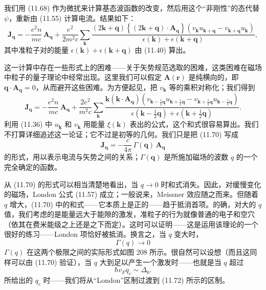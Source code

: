 我们用 (11.68) 作为微扰来计算基态波函数的改变，然后用这个“非刚性”的态代替 $\psi$，重新由 (11.55) 计算电流。结果如下：
\begin{equation*}
\mathbf{J}_{\mathbf{q}} = -\frac{e^{2}n}{mc}\,\mathbf{A}_{\mathbf{q}} + \frac{e^{2}}{2m^{2}c}\sum_{\mathbf{k}}\frac{(2\mathbf{k}+\mathbf{q})\left\{(2\mathbf{k}+\mathbf{q})\cdot\mathbf{A}_{\mathbf{q}}\right\}(v_{\mathbf{k}}u_{\mathbf{k}+\mathbf{q}} - v_{\mathbf{k}+\mathbf{q}}u_{\mathbf{k}})}{\epsilon(\mathbf{k})+\epsilon(\mathbf{k}+\mathbf{q})}, \tag{11.69}
\end{equation*}
其中准粒子对的能量 $\epsilon(\mathbf{k})+\epsilon(\mathbf{k}+\mathbf{q})$ 由 (11.40) 算出。

这一计算中存在一些形式上的困难——关于矢势规范选取的困难，这类困难在磁场中粒子的量子理论中经常出现。这里我们可以假定 $\mathbf{A}(\mathbf{r})$ 是纯横向的，即 $\mathbf{q}\cdot\mathbf{A}_{\mathbf{q}}=0$，从而避开这些困难。为方便起见，把 $v_{\mathbf{k}}$ 等的乘积对称化；我们得到
\begin{equation*}
\mathbf{J}_{\mathbf{q}} = -\frac{e^{2}n}{mc}\,\mathbf{A}_{\mathbf{q}} + \frac{2e^{2}}{m^{2}c}\sum_{\mathbf{k}}\frac{\mathbf{k}(\mathbf{k}\cdot\mathbf{A}_{\mathbf{q}})\left(v_{\mathbf{k}-\frac{1}{2}\mathbf{q}}u_{\mathbf{k}+\frac{1}{2}\mathbf{q}} - v_{\mathbf{k}+\frac{1}{2}\mathbf{q}}u_{\mathbf{k}-\frac{1}{2}\mathbf{q}}\right)}{\epsilon(\mathbf{k}-\frac{1}{2}\mathbf{q})+\epsilon(\mathbf{k}+\frac{1}{2}\mathbf{q})}. \tag{11.70}
\end{equation*}
利用 (11.36) 中 $u_{\mathbf{k}}$ 和 $v_{\mathbf{k}}$ 用能量 $\xi(\mathbf{k})$ 表出的公式，这个和式很容易算出。我们不打算详细追述这一论证；它不过是初等的几何。我们只是把 (11.70) 写成
\begin{equation*}
\mathbf{J}_{\mathbf{q}} = -\frac{c}{4\pi}\,\Gamma(\mathbf{q})\,\mathbf{A}_{\mathbf{q}} \tag{11.71}
\end{equation*}
的形式，用以表示电流与矢势之间的关系；$\Gamma(\mathbf{q})$ 是所施加磁场的波数 $q$ 的一个完全确定的函数。

从 (11.70) 的形式可以相当清楚地看出，当 $q\to 0$ 时和式消失。因此，对缓慢变化的磁场，London 公式 (11.57) 成立；一般说来，Meissner 效应随之而来。但随着 $q$ 增大，(11.70) 中的和式——它本质上是正的——趋于抵消首项。的确，对大的 $q$ 值，我们考虑的是能量远大于能隙的激发，准粒子的行为就像普通的电子和空穴（依其在费米能级之上还是之下而定）。这时可以证明——这是运用该理论的一个很好的练习——London 项恰好被抵消。换言之，当 $q$ 变大时，
\begin{equation*}
\Gamma(q) \to 0 \tag{11.72}
\end{equation*}
$\Gamma(q)$ 在这两个极限之间的实际形式如图 208 所示。很自然可以设想（而且这同样可以由 (11.70) 验证），当 $q$ 大到足以产生一个激发时——也就是当 $q$ 超过
\begin{equation*}
\hbar v_F q_c \sim \Delta_0. \tag{11.73}
\end{equation*}
所给出的 $q_c$ 时——我们将从“London”区制过渡到 (11.72) 所示的区制。

